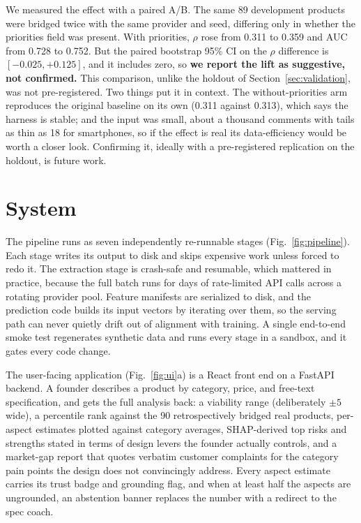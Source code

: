 \documentclass[journal]{IEEEtran}
\begin{document}
We measured the effect with a paired A/B. The same 89 development products were bridged twice with the same provider and seed, differing only in whether the priorities field was present. With priorities, $\rho$ rose from 0.311 to 0.359 and AUC from 0.728 to 0.752. But the paired bootstrap 95\% CI on the $\rho$ difference is $[-0.025, +0.125]$, and it includes zero, so \textbf{we report the lift as suggestive, not confirmed.} This comparison, unlike the holdout of Section~\ref{sec:validation}, was not pre-registered. Two things put it in context. The without-priorities arm reproduces the original baseline on its own (0.311 against 0.313), which says the harness is stable; and the input was small, about a thousand comments with tails as thin as 18 for smartphones, so if the effect is real its data-efficiency would be worth a closer look. Confirming it, ideally with a pre-registered replication on the holdout, is future work.

\section{System}
\label{sec:system}
The pipeline runs as seven independently re-runnable stages (Fig.~\ref{fig:pipeline}). Each stage writes its output to disk and skips expensive work unless forced to redo it. The extraction stage is crash-safe and resumable, which mattered in practice, because the full batch runs for days of rate-limited API calls across a rotating provider pool. Feature manifests are serialized to disk, and the prediction code builds its input vectors by iterating over them, so the serving path can never quietly drift out of alignment with training. A single end-to-end smoke test regenerates synthetic data and runs every stage in a sandbox, and it gates every code change.

The user-facing application (Fig.~\ref{fig:ui}a) is a React front end on a FastAPI backend. A founder describes a product by category, price, and free-text specification, and gets the full analysis back: a viability range (deliberately $\pm 5$ wide), a percentile rank against the 90 retrospectively bridged real products, per-aspect estimates plotted against category averages, SHAP-derived \cite{lundberg2017shap} top risks and strengths stated in terms of design levers the founder actually controls, and a market-gap report that quotes verbatim customer complaints for the category pain points the design does not convincingly address. Every aspect estimate carries its trust badge and grounding flag, and when at least half the aspects are ungrounded, an abstention banner replaces the number with a redirect to the spec coach.
\end{document}
